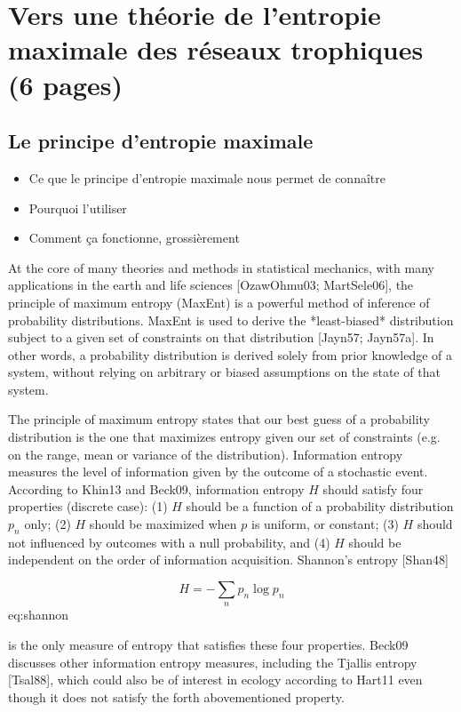 
\section{Vers une théorie de l'entropie maximale des réseaux trophiques (6 pages)}

\subsection{Le principe d'entropie maximale} 

\begin{itemize}
    \item Ce que le principe d'entropie maximale nous permet de connaître
    \item Pourquoi l'utiliser
    \item Comment ça fonctionne, grossièrement
\end{itemize}

At the core of many theories and methods in statistical mechanics, with many
applications in the earth and life sciences [OzawOhmu03; MartSele06], the
principle of maximum entropy (MaxEnt) is a powerful method of inference of
probability distributions. MaxEnt is used to derive the *least-biased*
distribution subject to a given set of constraints on that distribution
[Jayn57; Jayn57a]. In other words, a probability distribution is derived
solely from prior knowledge of a system, without relying on arbitrary or biased
assumptions on the state of that system.

The principle of maximum entropy states that our best guess of a probability
distribution is the one that maximizes entropy given our set of constraints
(e.g. on the range, mean or variance of the distribution). Information entropy
measures the level of information given by the outcome of a stochastic event. According to
Khin13 and Beck09, information entropy $H$ should satisfy four properties
(discrete case): (1) $H$ should be a function of a probability distribution
$p_n$ only; (2) $H$ should be maximized when $p$ is uniform, or constant; (3)
$H$ should not influenced by outcomes with a null probability, and (4) $H$
should be independent on the order of information acquisition. Shannon's entropy
[Shan48]

$$H = -\sum_{n} p_n \log p_n$${eq:shannon}

is the only measure of entropy that satisfies these four properties. Beck09
discusses other information entropy measures, including the Tjallis entropy
[Tsal88], which could also be of interest in ecology according to Hart11 even
though it does not satisfy the forth abovementioned property.

